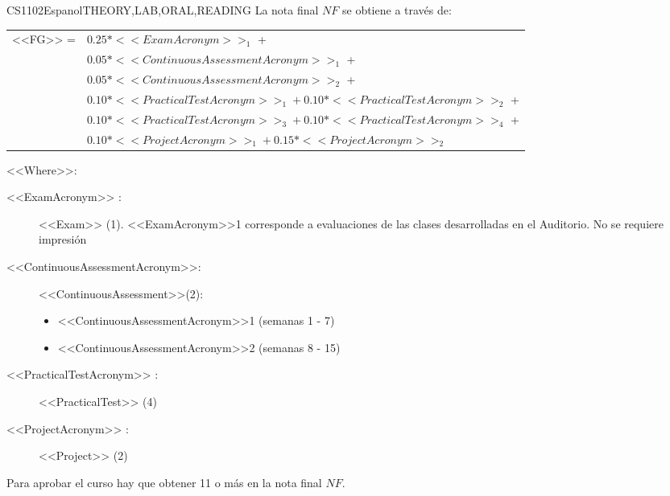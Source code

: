   
    \begin{evaluation}{CS1102}{Espanol}{THEORY,LAB,ORAL,READING}
    La nota final $NF$ se obtiene a través de: \\
   
    \begin{tabular}{cl}
      <<FG>> =  & $0.25*<<ExamAcronym>>_{1}$ +\\
                & $0.05*<<ContinuousAssessmentAcronym>>_{1}$ +  \\
                & $0.05*<<ContinuousAssessmentAcronym>>_{2}$ + \\
                & $0.10*<<PracticalTestAcronym>>_{1} + 0.10*<<PracticalTestAcronym>>_{2}$ +\\
                & $0.10*<<PracticalTestAcronym>>_{3} + 0.10*<<PracticalTestAcronym>>_{4}$ + \\
                & $0.10*<<ProjectAcronym>>_{1} + 0.15*<<ProjectAcronym>>_{2}$
    \end{tabular}
 
    \noindent <<Where>>:
    \begin{description}
           \item[<<ExamAcronym>> :] <<Exam>> (1). <<ExamAcronym>>1 corresponde a evaluaciones de las clases desarrolladas en el Auditorio. No se requiere impresión
           \item[<<ContinuousAssessmentAcronym>>:]<<ContinuousAssessment>>(2):
               \begin{itemize}
                  \item <<ContinuousAssessmentAcronym>>1 (semanas 1 - 7) 
                   \item <<ContinuousAssessmentAcronym>>2 (semanas 8 - 15)
               \end{itemize}
      \item[<<PracticalTestAcronym>> :] <<PracticalTest>> (4)
      \item[<<ProjectAcronym>> :] <<Project>> (2)
    \end{description}
   
    \noindent Para aprobar el curso hay que obtener 11 o más en la nota final $NF$.
    \end{evaluation}
   
   
   
